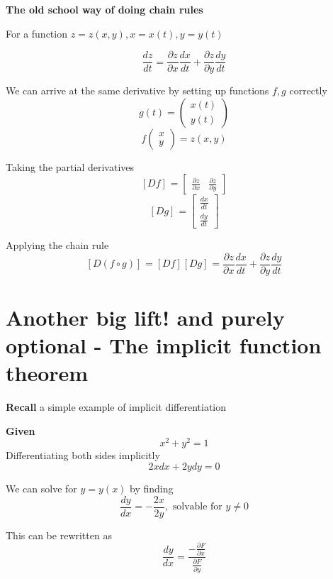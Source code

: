 \begin{framed}
\textbf{The old school way of doing chain rules}

For a function $z = z(x, y), x = x(t), y = y(t)$

\[
  \frac{dz}{dt} = \frac{\partial z}{\partial x} \frac{dx}{dt} + \frac{\partial z}{\partial y} \frac{dy}{dt}
\] 

We can arrive at the same derivative by setting up functions $f, g$ correctly 
\[
  g(t) = \begin{pmatrix} x(t) \\ y(t) \end{pmatrix} 
\] 
\[
  f \begin{pmatrix} x \\ y \end{pmatrix} = z(x, y)
\] 

Taking the partial derivatives
\[
\left[ D f \right]_{} = \begin{bmatrix} 
   \frac{\partial z}{\partial x} & \frac{\partial z}{\partial y}  
\end{bmatrix}
\] 
\[
  \left[ D g \right]_{} = \begin{bmatrix} 
    \frac{dx}{dt} \\ \frac{dy}{dt}  
  \end{bmatrix}
\] 

Applying the chain rule
\[
\left[ D (f \circ g) \right]_{} = \left[ D f \right]_{} \left[ D g \right]_{}  = \frac{\partial z}{\partial x} \frac{dx}{dt} + \frac{\partial z}{\partial y} \frac{dy}{dt}
\] 
\end{framed}

\section{Another big lift! and purely optional - The implicit function theorem}

\textbf{Recall} a simple example of implicit differentiation

\textbf{Given} \[
  x^2 + y^2 = 1
\] 
Differentiating both sides implicitly
\[
  2x dx + 2ydy = 0
\] 

We can solve for $y = y(x)$ by finding
\[
   \frac{dy}{dx} = -\frac{2x}{2y}, \text{ solvable for } y \neq 0
\] 

This can be rewritten as 
\[
  \frac{dy}{dx} = \frac{ - \frac{\partial F}{\partial x}}{ \frac{\partial F}{\partial y}}
\] 

